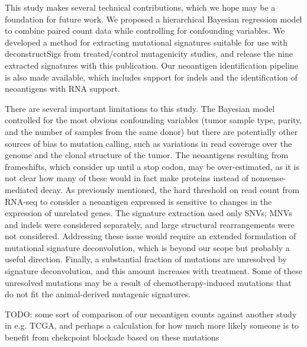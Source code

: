This study makes several technical contributions, which we hope may be a foundation for future work. We proposed a hierarchical Bayesian regression model to combine paired count data while controlling for confounding variables. We developed a method for extracting mutational signatures suitable for use with deconstructSigs from treated/control mutagenicity studies, and release the nine extracted signatures with this publication. Our neoantigen identification pipeline is also made available, which includes support for indels and the identification of neoantigens with RNA support. 

There are several important limitations to this study. The Bayesian model controlled for the most obvious confounding variables (tumor sample type, purity, and the number of samples from the same donor) but there are potentially other sources of bias to mutation calling, such as variations in read coverage over the genome and the clonal structure of the tumor. The neoantigens resulting from frameshifts, which consider up until a stop codon, may be over-estimated, as it is not clear how many of these would in fact make proteins  instead of nonsense-mediated decay. As previously mentioned, the hard threshold on read count from RNA-seq to consider a neoantigen expressed is sensitive to changes in the expression of unrelated genes. The signature extraction used only SNVs; MNVs and indels were considered separately, and large structural rearrangements were not considered. Addressing these issue would require an extended formulation of mutational signature deconvolution, which is beyond our scope but probably a useful direction. Finally, a substantial fraction of mutations are unresolved by signature deconvolution, and this amount increases with treatment. Some of these unresolved mutations may be a result of chemotherapy-induced mutations that do not fit the animal-derived mutagenic signatures. 


TODO: some sort of comparison of our neoantigen counts against another study in e.g. TCGA, and perhaps a calculation for how much more likely someone is to benefit from chekcpoint blockade based on these mutations


